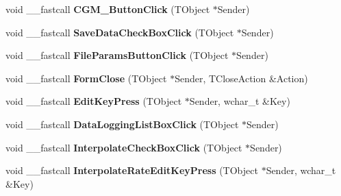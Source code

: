 \begin{DoxyCompactItemize}
\item 
\hypertarget{class_t_run_dynamic_clamp_form_a160d7ba495f32a232af213dc4f9529dc}{void \+\_\+\+\_\+fastcall {\bfseries C\+G\+M\+\_\+\+Button\+Click} (T\+Object $\ast$Sender)}\label{class_t_run_dynamic_clamp_form_a160d7ba495f32a232af213dc4f9529dc}

\item 
\hypertarget{class_t_run_dynamic_clamp_form_a031c331ed9e2f306abd8ca15529286a4}{void \+\_\+\+\_\+fastcall {\bfseries Save\+Data\+Check\+Box\+Click} (T\+Object $\ast$Sender)}\label{class_t_run_dynamic_clamp_form_a031c331ed9e2f306abd8ca15529286a4}

\item 
\hypertarget{class_t_run_dynamic_clamp_form_ac4e5f6ce8d2e491db75be6204af0d748}{void \+\_\+\+\_\+fastcall {\bfseries File\+Params\+Button\+Click} (T\+Object $\ast$Sender)}\label{class_t_run_dynamic_clamp_form_ac4e5f6ce8d2e491db75be6204af0d748}

\item 
\hypertarget{class_t_run_dynamic_clamp_form_af79c8113af87b17f48a9393bf0aca294}{void \+\_\+\+\_\+fastcall {\bfseries Form\+Close} (T\+Object $\ast$Sender, T\+Close\+Action \&Action)}\label{class_t_run_dynamic_clamp_form_af79c8113af87b17f48a9393bf0aca294}

\item 
\hypertarget{class_t_run_dynamic_clamp_form_a2de7e6942e073d984b80dab1f8dd48e5}{void \+\_\+\+\_\+fastcall {\bfseries Edit\+Key\+Press} (T\+Object $\ast$Sender, wchar\+\_\+t \&Key)}\label{class_t_run_dynamic_clamp_form_a2de7e6942e073d984b80dab1f8dd48e5}

\item 
\hypertarget{class_t_run_dynamic_clamp_form_a68cf1efe77c3e8f061370e64b0b6fa83}{void \+\_\+\+\_\+fastcall {\bfseries Data\+Logging\+List\+Box\+Click} (T\+Object $\ast$Sender)}\label{class_t_run_dynamic_clamp_form_a68cf1efe77c3e8f061370e64b0b6fa83}

\item 
\hypertarget{class_t_run_dynamic_clamp_form_ae24c6e2572703ad0624868566f3ede2e}{void \+\_\+\+\_\+fastcall {\bfseries Interpolate\+Check\+Box\+Click} (T\+Object $\ast$Sender)}\label{class_t_run_dynamic_clamp_form_ae24c6e2572703ad0624868566f3ede2e}

\item 
\hypertarget{class_t_run_dynamic_clamp_form_a5226faef0e5d4d407c910deb14e12142}{void \+\_\+\+\_\+fastcall {\bfseries Interpolate\+Rate\+Edit\+Key\+Press} (T\+Object $\ast$Sender, wchar\+\_\+t \&Key)}\label{class_t_run_dynamic_clamp_form_a5226faef0e5d4d407c910deb14e12142}


\end{DoxyCompactItemize}
